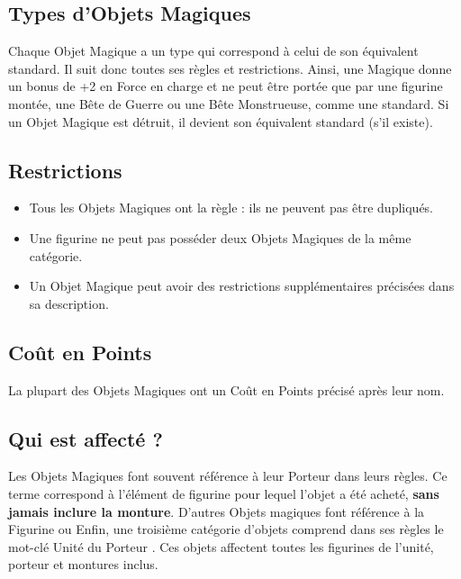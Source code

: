 \subsection{Types d'Objets Magiques}

Chaque Objet Magique a un type qui correspond à celui de son équivalent standard. Il suit donc toutes ses règles et restrictions. Ainsi, une \lance{} Magique donne un bonus de +2 en Force en charge et ne peut être portée que par une figurine montée, une Bête de Guerre ou une Bête Monstrueuse, comme une \lance{} standard. Si un Objet Magique est détruit, il devient son équivalent standard (s'il existe).

\subsection{Restrictions}

\begin{itemize}[label={\textbullet}]
\item Tous les Objets Magiques ont la règle \oneperarmy{} : ils ne peuvent pas être dupliqués.
\item Une figurine ne peut pas posséder deux Objets Magiques de la même catégorie.
\item Un Objet Magique peut avoir des restrictions supplémentaires précisées dans sa description.
\end{itemize}

\subsection{Coût en Points}

La plupart des Objets Magiques ont un Coût en Points précisé après leur nom. 

\subsection{Qui est affecté ?}

Les Objets Magiques font souvent référence à leur \og Porteur \fg{} dans leurs règles. Ce terme correspond à l'élément de figurine pour lequel l'objet a été acheté, \textbf{sans jamais inclure la monture}. D'autres Objets magiques font référence à la \og Figurine \fg{} ou  Enfin, une troisième catégorie d'objets comprend dans ses règles le mot-clé \og Unité du Porteur \fg{}. Ces objets affectent toutes les figurines de l'unité, porteur et montures inclus.

